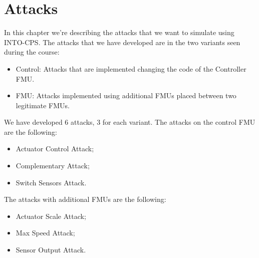 \chapter{Attacks}

In this chapter we're describing the attacks that we want to simulate using
INTO-CPS\@. The attacks that we have developed are in the two variants seen
during the course:

\begin{itemize}
	\item Control: Attacks that are implemented changing the code of the
		Controller FMU\@.
	\item FMU\@: Attacks implemented using additional FMUs placed between
		two legitimate FMUs.
\end{itemize}

We have developed 6 attacks, 3 for each variant. The attacks on the control FMU
are the following:

\begin{itemize}
	\item Actuator Control Attack;
	\item Complementary Attack;
	\item Switch Sensors Attack.
\end{itemize}

The attacks with additional FMUs are the following:

\begin{itemize}
	\item Actuator Scale Attack;
	\item Max Speed Attack;
	\item Sensor Output Attack.
\end{itemize}


\newpage


